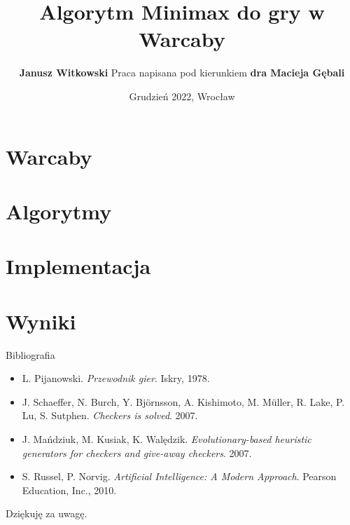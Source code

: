 \documentclass{beamer}
\title{Algorytm Minimax do gry w Warcaby}
\author{
	\textbf{Janusz Witkowski}
	\newline \newline
	Praca napisana pod kierunkiem \textbf{dra Macieja Gębali}
}
\date{Grudzień 2022, Wrocław}
\newcommand{\myitem}{\item[$\vartriangleright$]}
\begin{document}
\begin{frame}[plain]{}
	\titlepage
\end{frame}


\section{Warcaby}

\section{Algorytmy}

\section{Implementacja}


% 
% 
% 

\section{Wyniki}



% 

% 
% 
% 

\begin{frame}[plain]{Bibliografia}
	\begin{center}
		\begin{itemize}
			\myitem L. Pijanowski. \textit{Przewodnik gier}. Iskry, 1978.
			\myitem J. Schaeffer, N. Burch, Y. Björnsson, A. Kishimoto, M. Müller, R. Lake, P. Lu, S. Sutphen. \textit{Checkers is solved}. 2007.
			\myitem J. Mańdziuk, M. Kusiak, K. Walędzik. \textit{Evolutionary-based heuristic generators for checkers and give-away checkers}. 2007.
			\myitem S. Russel, P. Norvig. \textit{Artificial Intelligence: A Modern Approach}. Pearson Education, Inc., 2010.
		\end{itemize}
	\end{center}
\end{frame}

\begin{frame}[plain]{}
	\begin{center}
		\large{Dziękuję za uwagę.}
	\end{center}
\end{frame}
\end{document}

